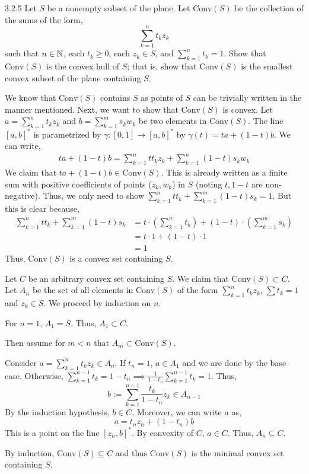 \documentclass[12pt]{amsart}
\begin{document}
\begin{problem}{3.2.5}
    Let $S$ be a nonempty subset of the plane. Let $\text{Conv}(S)$ be the collection of the sums of the form, 
    \[ \sum_{k=1}^n t_kz_k\]
    such that $n \in \mathbb N$, each $t_k \geq 0$, each $z_k \in S$, and $\sum_{k=1}^n t_k = 1$. Show that $\text{Conv}(S)$ is the convex hull of $S$; that is, show that $\text{Conv}(S)$ is the smallest convex subset of the plane containing $S$. 
\end{problem}
\begin{solution}
    We know that $\text{Conv}(S)$ contains $S$ as points of $S$ can be trivially written in the manner mentioned. Next, we want to show that $\text{Conv}(S)$ is convex. Let $a = \sum_{k=1}^n t_kz_k$ and $b = \sum_{k=1}^m s_kw_k$ be two elements in $\text{Conv}(S)$. The line $[a,b]^*$ is parametrized by $\gamma: [0, 1] \to [a,b]^*$ by $\gamma(t) = ta + (1-t)b$. We can write, 
    \begin{align*}
        ta + (1-t)b = \sum_{k=1}^n tt_kz_k + \sum_{k=1}^n (1-t)s_kw_k
    \end{align*}
    We claim that $ta+(1-t)b \in \text{Conv}(S)$. This is already written as a finite sum with positive coefficients of points ($z_k, w_k$) in $S$ (noting $t, 1-t$ are non-negative). Thus, we only need to show $\sum_{k=1}^n tt_k + \sum_{k=1}^m (1-t)s_k = 1$. But this is clear because, 
    \begin{align*}
        \sum_{k=1}^n tt_k + \sum_{k=1}^m (1-t)s_k &= t \cdot \left(\sum_{k=1}^n t_k\right) + (1-t)\cdot \left(\sum_{k=1}^m s_k\right) \\
        &= t \cdot 1 + (1-t) \cdot 1 \\
        &= 1
    \end{align*}
    Thus, $\text{Conv}(S)$ is a convex set containing $S$. \bbni

    Let $C$ be an arbitrary convex set containing $S$. We claim that $\text{Conv}(S) \subset C$. Let $A_n$ be the set of all elements in $\text{Conv}(S)$ of the form $\sum_{k=1}^n t_kz_k$, $\sum t_k = 1$ and $z_k \in S$. We proceed by induction on $n$. 

    For $n = 1$, $A_1 = S$. Thus, $A_1 \subset C$. 

    Then assume for $m < n$ that $A_m \subset \text{Conv}(S)$. 
    
    Consider $a = \sum_{k=1}^n t_kz_k \in A_n$. If $t_n = 1$, $a \in A_{1}$ and we are done by the base case. Otherwise, $\sum_{k=1}^{n-1} t_k = 1-t_n \implies \frac{1}{1-t_n}\sum_{k=1}^{n-1} t_k = 1$. Thus, 
    \[ b := \sum_{k=1}^{n-1}\frac{t_k}{1-t_n}z_k \in A_{n-1}\]
    By the induction hypothesis, $b \in C$. Moreover, we can write $a$ as, 
    \[ a = t_nz_n + (1-t_n)b\]
    This is a point on the line $[z_n, b]^*$. By convexity of $C$, $ a \in C$. Thus, $A_n \subseteq C$. 

    By induction, $\text{Conv}(S) \subseteq C$ and thus $\text{Conv}(S)$ is the minimal convex set containing $S$.  
\end{solution}
\end{document}
